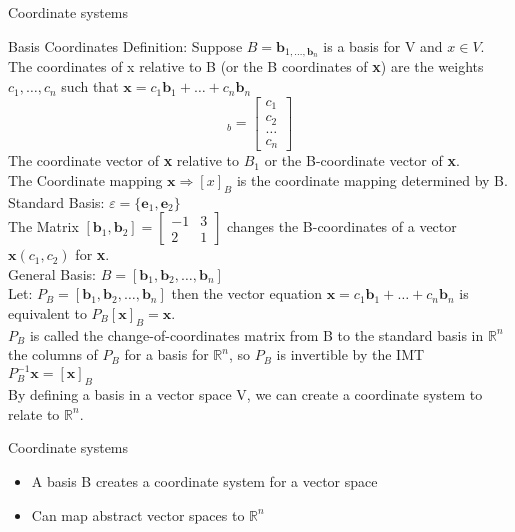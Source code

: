 \documentclass[a4paper, 12pt]{article}
\begin{document}
\begin{section}{Coordinate systems}
\begin{subsection}
\begin{itemize}
\end{itemize}
\end{subsection}
\begin{subsection}{Basis Coordinates}
Definition: Suppose $B=\textbf{b}_{1,\dots,\textbf{b}_{n}}$ is a basis for V and 
$x \in V$. The coordinates of x relative to B (or the B coordinates of \textbf{x})
are the weights $c_1,\dots,c_{n}$ such that $\textbf{x}=c_1\textbf{b}_{1}+\dots+
c_{n}\textbf{b}_{n}$
\begin{equation}
[x]_{b}=\begin{bmatrix} c_1\\ c_2\\ \dots\\ c_{n} \end{bmatrix} 
\end{equation}
The coordinate vector of \textbf{x} relative to $B_1$ or the B-coordinate vector 
of \textbf{x}. \\
The Coordinate mapping $\textbf{x}\Rightarrow [x]_{B}$ is the coordinate mapping 
determined by B.\\
Standard Basis: $\varepsilon = \{\textbf{e}_1,\textbf{e}_{2}\}$
\\ The Matrix $[\textbf{b}_1,\textbf{b}_{2}]=\begin{bmatrix} -1&3\\2&1
\end{bmatrix} $ changes the B-coordinates of a vector $\textbf{x}(c_1,c_2)$ for
\textbf{x}. \\
General Basis: $B=[\textbf{b}_{1},\textbf{b}_{2},\dots,\textbf{b}_{n}]$\\
Let: $P_{B}=[\textbf{b}_{1},\textbf{b}_{2},\dots,\textbf{b}_{n}]$ then the vector
equation $\textbf{x}=c_1\textbf{b}_{1}+\dots+c_{n}\textbf{b}_{n}$ is equivalent
to $P_{B}[\textbf{x}]_{B}=\textbf{x}$.\\
$P_{B}$ is called the change-of-coordinates matrix from B to the standard basis
in $\mathbb{R}^{n}$ the columns of $P_{B}$ for a basis for $\mathbb{R}^{n}$, so 
$P_{B}$ is invertible by the IMT $P_{B}^{-1}\textbf{x}=[\textbf{x}]_{B}$\\
By defining a basis in a vector space V, we can create a coordinate system to 
relate to $\mathbb{R}^{n}$.
\end{subsection}
\begin{subsection}{Coordinate systems}
\begin{itemize}
\item{A basis B creates a coordinate system for a vector space}
\item{Can map abstract vector spaces to $\mathbb{R}^{n}$}

\end{itemize}
\end{subsection}
\end{section}
\end{document}
